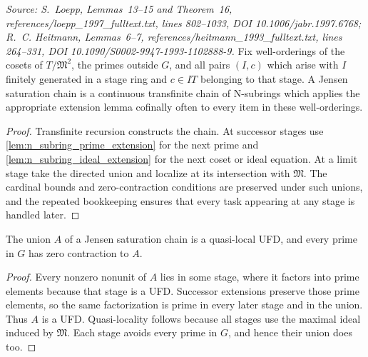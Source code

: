 \begin{definition}
  \label{def:jensen_saturation_chain}
  \textit{Source: S.~Loepp, Lemmas~13--15 and Theorem~16,
  references/loepp\_1997\_fulltext.txt, lines 802--1033,
  DOI 10.1006/jabr.1997.6768; R.~C. Heitmann, Lemmas~6--7,
  references/heitmann\_1993\_fulltext.txt, lines 264--331,
  DOI 10.1090/S0002-9947-1993-1102888-9.}
  Fix well-orderings of the cosets of \(T/\mathfrak M^2\), the primes outside
  \(G\), and all pairs \((I,c)\) which arise with \(I\) finitely generated in
  a stage ring and \(c\in IT\) belonging to that stage.  A Jensen saturation
  chain is a continuous transfinite chain of N-subrings which applies the
  appropriate extension lemma cofinally often to every item in these
  well-orderings.
\end{definition}

\begin{proof}
  Transfinite recursion constructs the chain.  At successor stages use
  \cref{lem:n_subring_prime_extension} for the next prime and
  \cref{lem:n_subring_ideal_extension} for the next coset or ideal equation.
  At a limit stage take the directed union and localize at its intersection
  with \(\mathfrak M\).  The cardinal bounds and zero-contraction conditions
  are preserved under such unions, and the repeated bookkeeping ensures that
  every task appearing at any stage is handled later.
\end{proof}

\begin{lemma}
  \label{lem:jensen_union_ufd}
  The union \(A\) of a Jensen saturation chain is a quasi-local UFD, and every
  prime in \(G\) has zero contraction to \(A\).
\end{lemma}

\begin{proof}
  Every nonzero nonunit of \(A\) lies in some stage, where it factors into
  prime elements because that stage is a UFD.  Successor extensions preserve
  those prime elements, so the same factorization is prime in every later
  stage and in the union.  Thus \(A\) is a UFD.  Quasi-locality follows
  because all stages use the maximal ideal induced by \(\mathfrak M\).
  Each stage avoids every prime in \(G\), and hence their union does too.
\end{proof}

